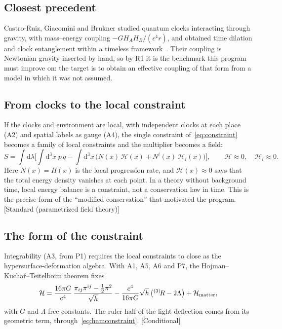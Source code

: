 \documentclass[11pt]{article}
\newcommand{\Pg}{\Pi}                 %
\newcommand{\dd}{\mathrm{d}}
\newcommand{\st}[1]{\textsf{\small[#1]}}
\theoremstyle{plain}
\theoremstyle{definition}
\theoremstyle{remark}
\begin{document}
\subsection{Closest precedent}

Castro-Ruiz, Giacomini and Brukner studied quantum clocks interacting through gravity, with mass--energy coupling $-G H_A H_B/(c^4 r)$, and obtained time dilation and clock entanglement within a timeless framework~\cite{CastroRuiz2017}. Their coupling is Newtonian gravity inserted by hand, so by R1 it is the benchmark this program must improve on: the target is to obtain an effective coupling of that form from a model in which it was not assumed.

\subsection{From clocks to the local constraint}

If the clocks and environment are local, with independent clocks at each place (A2) and spatial labels as gauge (A4), the single constraint of~\eqref{eq:constraint} becomes a family of local constraints and the multiplier becomes a field:
\begin{equation}
S=\int\dd\lambda\Big[\int\dd^3x\;p\,\dot q-\int\dd^3x\,\big(N(x)\,\mathcal H(x)+N^i(x)\,\mathcal H_i(x)\big)\Big],
\qquad \mathcal H\approx0,\quad \mathcal H_i\approx0 .
\end{equation}
Here $N(x)=\Pg(x)$ is the local progression rate, and $\mathcal H(x)\approx0$ says that the total energy density vanishes at each point. In a theory without background time, local energy balance is a constraint, not a conservation law in time. This is the precise form of the ``modified conservation'' that motivated the program. \st{Standard (parametrized field theory)}

\subsection{The form of the constraint}

Integrability (A3, from P1) requires the local constraints to close as the hypersurface-deformation algebra. With A1, A5, A6 and P7, the Hojman--Kucha\v{r}--Teitelboim theorem fixes
\begin{equation}
\mathcal H=\frac{16\pi G}{c^4}\,\frac{\pi_{ij}\pi^{ij}-\tfrac12\pi^2}{\sqrt h}-\frac{c^4}{16\pi G}\sqrt h\,\big({}^{(3)}\!R-2\Lambda\big)+\mathcal H_{\rm matter},
\end{equation}
with $G$ and $\Lambda$ free constants. The ruler half of the light deflection comes from its geometric term, through~\eqref{eq:hamconstraint}. \st{Conditional}
\end{document}
